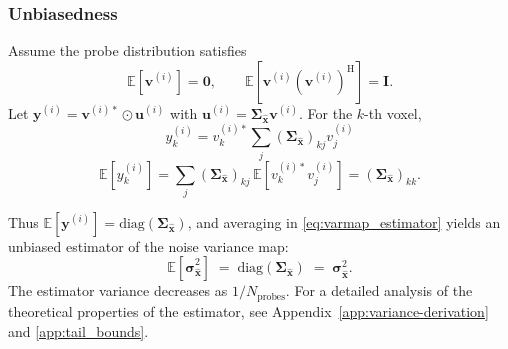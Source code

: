 \documentclass[AMA,STIX2COL,Linenumberson]{MRM}
\begin{document}
\subsubsection{Unbiasedness}
Assume the probe distribution satisfies
\begin{equation}
\mathbb{E}\!\left[\mathbf{v}^{(i)}\right]=\mathbf{0},
\qquad
\mathbb{E}\!\left[\mathbf{v}^{(i)}(\mathbf{v}^{(i)})^{\mathrm{H}}\right]=\mathbf{I}.
\label{eq:probe_conditions}
\end{equation}
Let $\mathbf{y}^{(i)}=\mathbf{v}^{(i)*}\odot \mathbf{u}^{(i)}$ with $\mathbf{u}^{(i)}=\boldsymbol{\Sigma}_{\hat{\mathbf{x}}}\mathbf{v}^{(i)}$.
For the $k$-th voxel,
\[
y^{(i)}_k = v_k^{(i)*}\!\sum_{j}(\boldsymbol{\Sigma}_{\hat{\mathbf{x}}})_{kj} v^{(i)}_j
\]
\begin{equation}
\mathbb{E}\!\left[y^{(i)}_k\right]
= \sum_{j}(\boldsymbol{\Sigma}_{\hat{\mathbf{x}}})_{kj}\,\mathbb{E}\!\left[v_k^{(i)*} v^{(i)}_j\right]
= (\boldsymbol{\Sigma}_{\hat{\mathbf{x}}})_{kk}.
\label{eq:unbiasedness}
\end{equation}

Thus $\mathbb{E}\!\left[\mathbf{y}^{(i)}\right]=\mathrm{diag}(\boldsymbol{\Sigma}_{\hat{\mathbf{x}}})$, and averaging
in \eqref{eq:varmap_estimator} yields an unbiased estimator of the noise variance map:
\begin{equation}
\mathbb{E}\!\left[\hat{\boldsymbol{\sigma}}^{2}_{\hat{\mathbf{x}}}\right]
\;=\;
\mathrm{diag}\!\left(\boldsymbol{\Sigma}_{\hat{\mathbf{x}}}\right)
\;=\;
\boldsymbol{\sigma}^{2}_{\hat{\mathbf{x}}}.
\label{eq:unbiasedness_result}
\end{equation}
The estimator variance decreases as $1/N_{\text{probes}}$. 
For a detailed analysis of the theoretical properties of the estimator, 
see Appendix~\ref{app:variance-derivation} and \ref{app:tail_bounds}.

\end{document}
